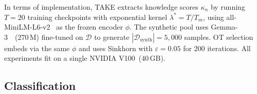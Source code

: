 \documentclass[12pt, a4paper, twoside]{book}
\numberwithin{equation}{chapter}
\theoremstyle{plain}
\theoremstyle{definition}
\theoremstyle{remark}
\newenvironment{foldable}{}{}
\begin{document}
\begin{foldable} In terms of implementation, TAKE extracts knowledge scores $\kappa_n$ by running $T=20$ training checkpoints with exponential kernel $\lambda^* = T/T_m$, using all-MiniLM-L6-v2~\cite{wang2020minilm} as the frozen encoder $\phi$.
  The synthetic pool uses Gemma-3~\cite{kamath2025gemma}~(270\,M) fine-tuned on $\mathcal{D}$ to generate $|\mathcal{D}_\text{synth}|=5{,}000$ samples.
  \Acl{OT} selection embeds via the same $\phi$ and uses Sinkhorn with $\varepsilon=0.05$ for 200 iterations.
  All experiments fit on a single NVIDIA V100~(40\,GB).
\end{foldable}

\subsection{Classification} \label{sec:54-research03-experiments-results-classification}
\end{document}
